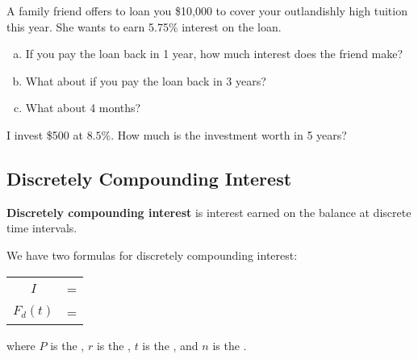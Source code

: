 \documentclass[notes]{subfiles}
\begin{document}
		\begin{ex} A family friend offers to loan you \$10,000 to cover your outlandishly high tuition this year.  She wants to earn 5.75\% interest on the loan.  
			\begin{enumerate}[(a)]
				\item If you pay the loan back in 1 year, how much interest does the friend make?

				\item What about if you pay the loan back in 3 years?

				\item What about 4 months?

			\end{enumerate}
		\end{ex}
			\newpage
			
		\begin{ex}
			I invest \$500 at $8.5\%$.  How much is the investment worth in 5 years?
		\end{ex}

	\subsection*{Discretely Compounding Interest}
		\begin{defn}
			\textbf{Discretely compounding interest} is interest earned on the balance at discrete time intervals.
		\end{defn}
			\vspace{.1in}

		We have two formulas for discretely compounding interest:
			\begin{center}
				\begin{tabular}{cc}
					$I$			&= \fitb{$\dfrac{r}{n}$}{}\\[15pt]
					$F_d(t)$ 	&= \fitb{$P\lrpar{1+\dfrac{r}{n}}^{nt}$ dollars}{}
				\end{tabular}
			\end{center}
			\vspace{.1in}

		where $P$ is the , $r$ is the , $t$ is the , and $n$ is the .
			
\end{document}
